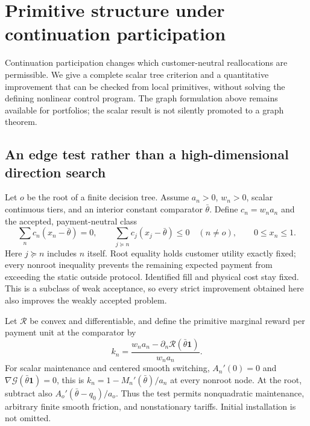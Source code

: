 \section{Primitive structure under continuation participation}\label{sec:r10-tree}
Continuation participation changes which customer-neutral reallocations are permissible. We give a complete scalar tree criterion and a quantitative improvement that can be checked from local primitives, without solving the defining nonlinear control program. The graph formulation above remains available for portfolios; the scalar result is not silently promoted to a graph theorem.

\subsection{An edge test rather than a high-dimensional direction search}
Let $o$ be the root of a finite decision tree. Assume $a_n>0$, $w_n>0$, scalar continuous tiers, and an interior constant comparator $\bar\theta$. Define $c_n=w_na_n$ and the accepted, payment-neutral class
\begin{equation}\label{eq:r10-subtrees}
 \sum_n c_n(x_n-\bar\theta)=0,\qquad
 \sum_{j\succeq n}c_j(x_j-\bar\theta)\leq0\quad(n\ne o),\qquad 0\leq x_n\leq1.
\end{equation}
Here $j\succeq n$ includes $n$ itself. Root equality holds customer utility exactly fixed; every nonroot inequality prevents the remaining expected payment from exceeding the static outside protocol. Identified fill and physical cost stay fixed. This is a subclass of weak acceptance, so every strict improvement obtained here also improves the weakly accepted problem.

Let $\mathcal R$ be convex and differentiable, and define the primitive marginal reward per payment unit at the comparator by
\begin{equation}\label{eq:r10-k}
 k_n=\frac{w_na_n-\partial_n\mathcal R(\bar\theta\mathbf1)}{w_na_n}.
\end{equation}
For scalar maintenance and centered smooth switching, $A_n'(0)=0$ and $\nabla\mathcal G(\bar\theta\mathbf1)=0$, this is $k_n=1-M_n'(\bar\theta)/a_n$ at every nonroot node. At the root, subtract also $A_o'(\bar\theta-q_0)/a_o$. Thus the test permits nonquadratic maintenance, arbitrary finite smooth friction, and nonstationary tariffs. Initial installation is not omitted.

